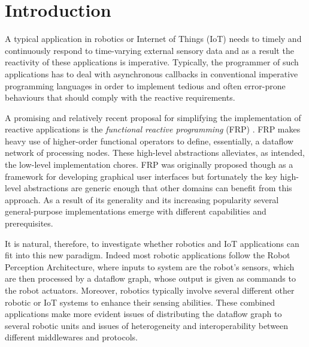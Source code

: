\documentclass[sigplan,screen,review,anonymous]{acmart}
\begin{document}

\maketitle

\section{Introduction} \label{sec:introduction}

A typical application in robotics or Internet of Things (IoT) needs to timely and
continuously respond to time-varying external sensory data and as a result the
reactivity of these applications is imperative. Typically, the programmer of such
applications has to deal with asynchronous callbacks in conventional imperative
programming languages in order to implement tedious and often error-prone behaviours
that should comply with the reactive requirements.

A promising and relatively recent proposal for simplifying the implementation of
reactive applications is the \emph{functional reactive programming} (FRP) \cite{fran}.
FRP makes heavy use of higher-order functional operators to define, essentially, a
dataflow network of processing nodes. These high-level abstractions
alleviates, as intended, the low-level implementation chores. FRP was originally proposed
though as a framework for developing graphical user interfaces but fortunately the key
high-level abstractions are generic enough that other domains can benefit from this
approach. As a result of its generality and its increasing popularity several
general-purpose implementations emerge with different capabilities and prerequisites.

It is natural, therefore, to investigate whether robotics and IoT applications
can fit into this new paradigm. Indeed most robotic applications follow the
Robot Perception Architecture, where inputs to system are the robot's
sensors, which are then processed by a dataflow graph, whose output is given as
commands to the robot actuators. Moreover, robotics typically involve several
different other robotic or IoT systems to enhance their sensing abilities. These
combined applications make more evident issues of distributing the dataflow graph to
several robotic units and issues of heterogeneity and interoperability between
different middlewares and protocols.
\end{document}
